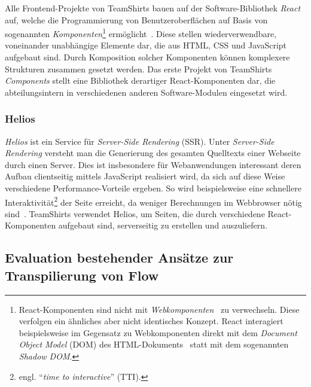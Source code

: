 Alle Frontend-Projekte von TeamShirts bauen auf der Software-Bibliothek \textit{React}~\autocite{SOFTWARE:REACT} auf, welche die Programmierung von Benutzeroberflächen auf Basis von sogenannten \emph{Komponenten}\footnote{React-Komponenten sind nicht mit \textit{Webkomponenten}~\autocite{MDN:WEBCOMPONENTS} zu verwechseln. Diese verfolgen ein ähnliches aber nicht identisches Konzept. React interagiert beispielsweise im Gegensatz zu Webkomponenten direkt mit dem \textit{Document Object Model} (DOM) des HTML-Dokuments~\autocite{REACT:WEBCOMPONENTS} statt mit dem sogenannten \textit{Shadow DOM}.} ermöglicht~\autocite{ACM:REACT}. Diese stellen wiederverwendbare, voneinander unabhängige Elemente dar, die aus HTML, CSS und JavaScript aufgebaut sind. Durch Komposition solcher Komponenten können komplexere Strukturen zusammen gesetzt werden. Das erste Projekt von TeamShirts \textit{Components} stellt eine Bibliothek derartiger React-Komponenten dar, die abteilungsintern in verschiedenen anderen Software-Modulen eingesetzt wird.

\subsubsection{Helios}

\textit{Helios} ist ein Service für \emph{Server-Side Rendering} (SSR). Unter \emph{Server-Side Rendering} versteht man die Generierung des gesamten Quelltexts einer Webseite durch einen Server. Dies ist insbesondere für Webanwendungen interessant deren Aufbau clientseitig mittels JavaScript realisiert wird, da sich auf diese Weise verschiedene Performance-Vorteile ergeben. So wird beispielsweise eine schnellere Interaktivität\footnote{engl. \enquote{\textit{time to interactive}} (TTI).} der Seite erreicht, da weniger Berechnungen im Webbrowser nötig sind~\autocite{GOOGLE:RENDERING_ON_THE_WEB}. TeamShirts verwendet Helios, um Seiten, die durch verschiedene React-Komponenten aufgebaut sind, serverseitig zu erstellen und auszuliefern.

\subsection{Evaluation bestehender Ansätze zur Transpilierung von Flow}
\label{sec:evaluation-other-transpilers}

